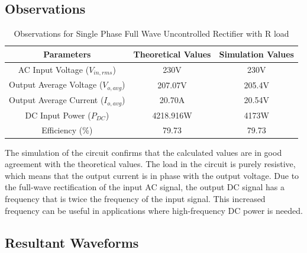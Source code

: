 \subsection{Observations}

\begin{table}[h]
    \renewcommand{\arraystretch}{1.3}
    \label{table_observation_circuit_1}
    \centering
    \begin{tabular}{|c|c|c|}
        \hline
        Parameters                              & Theoretical Values & Simulation Values \\
        \hline
        \hline
        AC Input Voltage ($ V_{in,rms} $)       & 230V               & 230V              \\
        \hline
        Output Average Voltage ($ V_{o,avg} $)  & 207.07V            & 205.4V            \\
        \hline
        Output Average Current ($ I_{o,avg}  $) & 20.70A             & 20.54V            \\
        \hline
        DC Input Power ($ P_{DC}  $)            & 4218.916W          & 4173W             \\
        \hline
        Efficiency (\%)                         & 79.73              & 79.73             \\
        \hline
    \end{tabular}
    \caption{Observations for Single Phase Full Wave Uncontrolled Rectifier with R load}

\end{table}


The simulation of the circuit confirms that the calculated values are in good agreement with the theoretical values. The load in the circuit is purely resistive, which means that the output current is in phase with the output voltage. Due to the full-wave rectification of the input AC signal, the output DC signal has a frequency that is twice the frequency of the input signal. This increased frequency can be useful in applications where high-frequency DC power is needed.
\pagebreak

\subsection{Resultant Waveforms}

